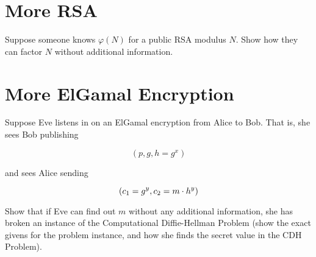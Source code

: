 \documentclass[12pt]{article}
\begin{document}

\section{More RSA}

Suppose someone knows $\varphi(N)$ for a public RSA modulus $N$. Show how they can factor $N$ without additional information.


\section{More ElGamal Encryption}

Suppose Eve listens in on an ElGamal encryption from Alice to Bob. That is, she sees Bob publishing

$$(p, g, h = g^x)$$

and sees Alice sending

$$(c_1 = g^y, c_2 = m \cdot h^y)$$


Show that if Eve can find out $m$ without any additional information, she has broken an instance of the Computational Diffie-Hellman Problem (show the exact givens for the problem instance, and how she finds the secret value in the CDH Problem).


\end{document}
